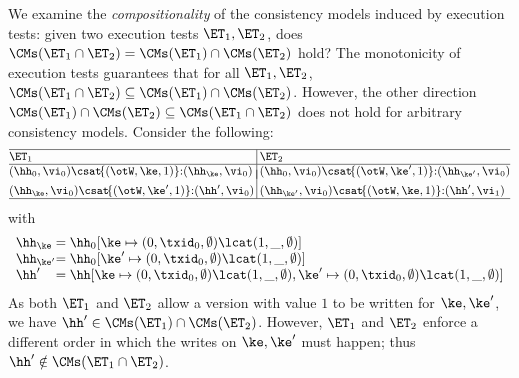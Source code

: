 We examine the \emph{compositionality} of the consistency models induced by execution tests:  
\ie given two execution tests $\ET_1, \ET_2$, does 
$\CMs(\ET_1 \cap \ET_2) = \CMs(\ET_1) \cap \CMs(\ET_2)$ hold? 
The monotonicity of execution tests guarantees that 
 for all $\ET_1, \ET_2$, \( \CMs(\ET_1 \cap \ET_2) \subseteq \CMs(\ET_1) \cap \CMs(\ET_2) \). 
However, the other direction \( \CMs(\ET_1) \cap \CMs(\ET_2) \subseteq \CMs(\ET_1 \cap \ET_2) \) does not hold for arbitrary consistency models.
Consider the following:
\[
\small
\begin{array}{@{}l @{\hspace{2pt}} | @{\hspace{2pt}} l@{}}
    \hline
    \ET_1 & \ET_2 \\
%    
    \hline
    (\hh_{0}, \vi_{0}) \csat\! \{(\otW, \ke, 1)\} {:} ( \hh_{\ke}, \vi_{0})
    &
    (\hh_{0}, \vi_{0}) \csat\! \{(\otW, \ke', 1)\} {:} ( \hh_{\ke'}, \vi_{0}) 
    \vspace*{-7pt}\\\\
    (\hh_{\ke}, \vi_{0}) \csat  \!\{(\otW, \ke', 1)\} {:} (\hh',\vi_{0}) 
    &
    (\hh_{\ke'}, \vi_{0}) \csat \!\{(\otW, \ke, 1)\} {:} (\hh',\vi_{1}) 
    \\
\hline
\end{array}
\]
with 
\[
    \begin{array}{l@{} l}
    \hh_{\ke} & = \hh_{0}[\ke \mapsto (0, \txid_{0}, \emptyset) \lcat (1, \_, \emptyset)] \\
    \hh_{\ke'} & = \hh_{0}[\ke' \mapsto (0, \txid_{0}, \emptyset) \lcat (1, \_, \emptyset)] \\
    \hh' & = \hh[\ke \mapsto (0, \txid_{0}, \emptyset) \lcat (1, \_, \emptyset) 
                ,\ke' \mapsto (0, \txid_{0}, \emptyset) \lcat (1, \_, \emptyset)] \\
\end{array}
\]
As both $\ET_1$ and $\ET_2$ allow a version with value $1$ to be written for 
$\ke, \ke'$,  we have $\hh' \in \CMs(\ET_1) \cap \CMs(\ET_2)$. 
However, $\ET_1$ and $\ET_2$ enforce a different order in which the writes on $\ke, \ke'$ must happen; 
thus $\hh' \notin \CMs(\ET_1 \cap \ET_2)$. 

